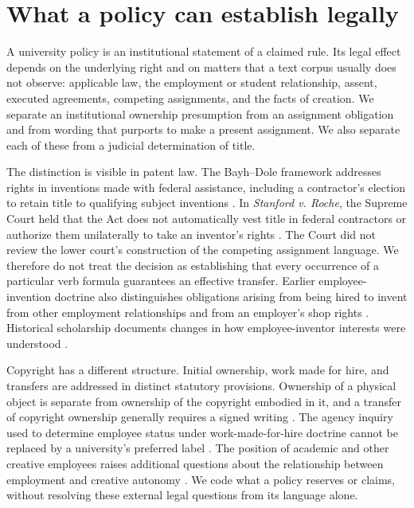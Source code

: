 \documentclass[12pt]{article}
\begin{document}
\section{What a policy can establish legally}
A university policy is an institutional statement of a claimed rule. Its legal effect depends on the underlying right and on matters that a text corpus usually does not observe: applicable law, the employment or student relationship, assent, executed agreements, competing assignments, and the facts of creation. We separate an institutional ownership presumption from an assignment obligation and from wording that purports to make a present assignment. We also separate each of these from a judicial determination of title.

The distinction is visible in patent law. The Bayh--Dole framework addresses rights in inventions made with federal assistance, including a contractor's election to retain title to qualifying subject inventions \citep{bayhdole2024}. In \textit{Stanford v. Roche}, the Supreme Court held that the Act does not automatically vest title in federal contractors or authorize them unilaterally to take an inventor's rights \citep[pp. 785--789]{roche2011}. The Court did not review the lower court's construction of the competing assignment language. We therefore do not treat the decision as establishing that every occurrence of a particular verb formula guarantees an effective transfer. Earlier employee-invention doctrine also distinguishes obligations arising from being hired to invent from other employment relationships and from an employer's shop rights \citep[pp. 187--189]{dubilier1933}. Historical scholarship documents changes in how employee-inventor interests were understood \citep{fisk1998}.

Copyright has a different structure. Initial ownership, work made for hire, and transfers are addressed in distinct statutory provisions. Ownership of a physical object is separate from ownership of the copyright embodied in it, and a transfer of copyright ownership generally requires a signed writing \citep[sections 101, 201, 202 and 204]{copyrightact}. The agency inquiry used to determine employee status under work-made-for-hire doctrine cannot be replaced by a university's preferred label \citep{reid1989}. The position of academic and other creative employees raises additional questions about the relationship between employment and creative autonomy \citep{dreyfuss1987}. We code what a policy reserves or claims, without resolving these external legal questions from its language alone.
\end{document}

